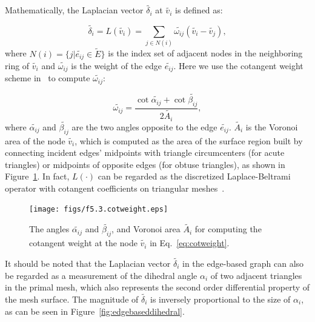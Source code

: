Mathematically, the Laplacian vector $\tilde{\delta_i}$ at $\tilde{v_i}$ is defined as:

\begin{equation}
\label{eq:edgelaplacian}
\tilde{\delta_i}=L(\tilde{v_i})=\sum\limits_{j\in N(i)}{\tilde{\omega_{ij}} (\tilde{v_i}-\tilde{v_j})},
\end{equation}
where $N(i)=\{j|\tilde{e_{ij}}\in \tilde{E}\}$ is the  index set of
adjacent nodes in the neighboring ring of $\tilde{v_i}$ and
$\tilde{\omega_{ij}}$ is the weight of the edge $\tilde{e_{ij}}$.
Here we use the cotangent weight scheme in~\cite{MDSB02} to compute
$\tilde{\omega_{ij}}$:

\begin{equation}
\label{eq:cotweight}
\tilde{\omega_{ij}}=\frac{{\cot{\tilde{\alpha_{ij}}}+\cot{\tilde{\beta_{ij}}}}}{{2\tilde{A_i}}},
\end{equation}
where $\tilde{\alpha_{ij}}$ and $\tilde{\beta_{ij}}$ are the two angles
opposite to the edge $\tilde{e_{ij}}$. $\tilde{A_i}$ is the Voronoi
area of the node $\tilde{v_i}$, which is computed as the area of
the surface region built by connecting incident edges' midpoints
with triangle circumcenters (for acute triangles) or midpoints of
opposite edges (for obtuse triangles), as shown
in Figure~\ref{fig:edgebasedcotweight}. In fact, $L(\cdot)$ can
be regarded as the discretized Laplace-Beltrami operator with
cotangent coefficients on triangular meshes~\cite{BS08}.

\begin{figure} [htbp]
    \centering
  \texttt{[image: figs/f5.3.cotweight.eps]}
  \caption{The angles $\tilde{\alpha_{ij}}$ and $\tilde{\beta_{ij}}$, and
  Voronoi area $\tilde{A_i}$ for computing the cotangent weight
  at the node $\tilde{v_i}$ in Eq.~\ref{eq:cotweight}.}
  \label{fig:edgebasedcotweight} %
\end{figure}


It should be noted that the Laplacian  vector $\tilde{\delta_i}$ in
the edge-based graph can also be regarded as a measurement of the
dihedral angle $\alpha_i$ of two adjacent triangles in the primal
mesh, which also represents the second order differential property
of the mesh surface. The magnitude of $\tilde{\delta_i}$ is
inversely proportional to the size of $\alpha_i$, as can be seen in
Figure~\ref{fig:edgebaseddihedral}.

